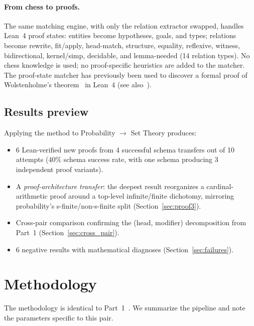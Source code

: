 \documentclass[11pt]{article}
\theoremstyle{definition}
\theoremstyle{remark}
\begin{document}
\paragraph{From chess to proofs.}  The same matching engine, with only
the relation extractor swapped, handles Lean~4 proof states: entities
become hypotheses, goals, and types; relations become rewrite,
fit/apply, head-match, structure, equality, reflexive, witness,
bidirectional, kernel/simp, decidable, and lemma-needed (14 relation
types).  No chess knowledge is used; no proof-specific heuristics are
added to the matcher.  The proof-state matcher has previously been
used to discover a formal proof of Wolstenholme's
theorem~\cite{linhares_wolstenholme_2026} in Lean~4
(see also~\cite{linhares_sketch_2026}).

\subsection{Results preview}

Applying the method to Probability $\to$ Set Theory produces:

\begin{itemize}
\item 6 Lean-verified new proofs from 4 successful schema transfers
  out of 10 attempts (40\% schema success rate, with one schema
  producing 3 independent proof variants).
\item A \emph{proof-architecture transfer}: the deepest result
  reorganizes a cardinal-arithmetic proof around a top-level
  infinite/finite dichotomy, mirroring probability's
  s-finite/non-s-finite split (Section~\ref{sec:proof3}).
\item Cross-pair comparison confirming the (head, modifier)
  decomposition from Part~1 (Section~\ref{sec:cross_pair}).
\item 6 negative results with mathematical diagnoses
  (Section~\ref{sec:failures}).
\end{itemize}

\section{Methodology}\label{sec:method}

The methodology is identical to Part~1~\cite{yanasse_part1}.  We
summarize the pipeline and note the parameters specific to this pair.
\end{document}

